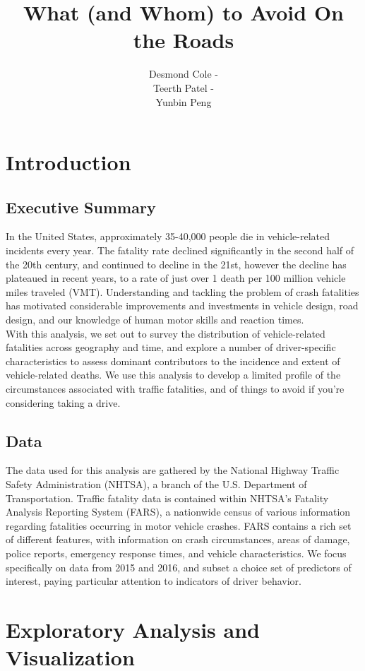 \documentclass[11pt, oneside,titlepage]{article}   	%
\title{What (and Whom) to Avoid On the Roads}
\author{Desmond Cole - \\
Teerth Patel - \\ 
Yunbin Peng}
\begin{document}
\maketitle
\section*{Introduction}
\subsection*{Executive Summary}
In the United States, approximately 35-40,000 people die in vehicle-related incidents every year. The fatality rate declined significantly in the second half of the 20th century, and continued to decline in the 21st, however the decline has plateaued in recent years, to a rate of just over 1 death per 100 million vehicle miles traveled (VMT). Understanding and tackling the problem of crash fatalities has motivated considerable improvements and investments in vehicle design, road design, and our knowledge of human motor skills and reaction times. \\ 

With this analysis, we set out to survey the distribution of vehicle-related fatalities across geography and time, and explore a number of driver-specific characteristics to assess dominant contributors to the incidence and extent of vehicle-related deaths. We use this analysis to develop a limited profile of the circumstances associated with traffic fatalities, and of things to avoid if you're considering taking a drive.

\subsection*{Data}
The data used for this analysis are gathered by the National Highway Traffic Safety Administration (NHTSA), a branch of the U.S. Department of Transportation. Traffic fatality data is contained within NHTSA's Fatality Analysis Reporting System (FARS), a nationwide census of various information regarding fatalities occurring in motor vehicle crashes. FARS contains a rich set of different features, with information on crash circumstances, areas of damage, police reports, emergency response times, and vehicle characteristics. We focus specifically on data from 2015 and 2016, and subset a choice set of predictors of interest, paying particular attention to indicators of driver behavior.

\section*{Exploratory Analysis and Visualization}
\end{document}
